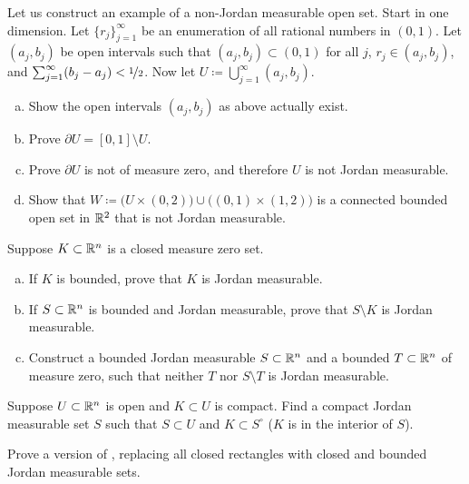 \begin{exercise}
Let us construct an example of a non-Jordan measurable open set.
Start in one dimension.  Let $\{ r_j \}_{j=1}^\infty$ be an enumeration
of all rational numbers in $(0,1)$.  Let $(a_j,b_j)$ be open intervals
such that $(a_j,b_j) \subset (0,1)$ for all $j$, $r_j \in (a_j,b_j)$,
and $\sum_{j=1}^\infty (b_j-a_j) < \nicefrac{1}{2}$.  Now let $U \coloneqq
\bigcup_{j=1}^\infty (a_j,b_j)$.
\begin{enumerate}[a)]
\item
Show the open intervals $(a_j,b_j)$ as above actually exist.
\item
Prove $\partial U = [0,1] \setminus U$.
\item
Prove $\partial U$ is not of measure zero, and therefore $U$ is not Jordan measurable.
\item
Show that $W \coloneqq
\bigl( U \times (0,2) \bigr) \cup \bigl( (0,1) \times (1,2) \bigr)$
is a connected bounded open set in ${\mathbb{R}}^2$
that is not Jordan measurable.
\end{enumerate}
\end{exercise}

\begin{exercise}
Suppose $K \subset {\mathbb{R}}^n$ is a closed measure zero set.
\begin{enumerate}[a)]
\item
If $K$ is bounded, prove that $K$ is Jordan measurable.
\item
If $S \subset {\mathbb{R}}^n$ is bounded and Jordan measurable, prove that
$S \setminus K$ is Jordan measurable.
\item
Construct a bounded Jordan measurable $S \subset {\mathbb{R}}^n$
and a bounded $T \subset {\mathbb{R}}^n$ of measure zero, such that
neither $T$ nor $S \setminus T$ is Jordan measurable.
\end{enumerate}
\end{exercise}

\begin{exercise}
Suppose $U \subset {\mathbb{R}}^n$ is open and $K \subset U$ is compact.
Find a compact Jordan measurable set $S$ such that $S \subset U$
and $K \subset S^\circ$ ($K$ is in the interior of $S$).
\end{exercise}

\begin{exercise} \label{exercise:closednessofriemannintegrable}
Prove a version of , replacing all closed
rectangles with closed and bounded Jordan measurable sets.
\end{exercise}

